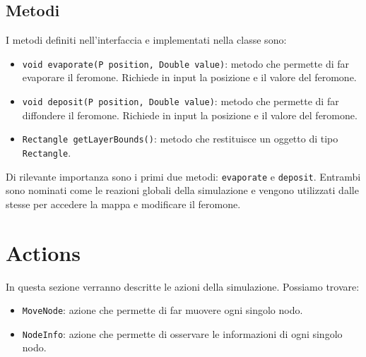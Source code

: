 \subsection{Metodi}
I metodi definiti nell'interfaccia e implementati nella classe sono:
\begin{itemize}
    \item \texttt{void evaporate(P position, Double value)}: metodo che permette di far evaporare il feromone. 
    Richiede in input la posizione e il valore del feromone.
    \item \texttt{void deposit(P position, Double value)}: metodo che permette di far diffondere il feromone.
     Richiede in input la posizione e il valore del feromone.
    \item \texttt{Rectangle getLayerBounds()}: metodo che restituisce un oggetto di tipo \texttt{Rectangle}.
\end{itemize}
Di rilevante importanza sono i primi due metodi: \texttt{evaporate} e \texttt{deposit}.
Entrambi sono nominati come le reazioni globali della simulazione e vengono utilizzati dalle stesse per accedere la mappa e modificare il feromone.


\section{Actions}
In questa sezione verranno descritte le azioni della simulazione. Possiamo trovare:
\begin{itemize}
    \item \texttt{MoveNode}: azione che permette di far muovere ogni singolo nodo.
    \item \texttt{NodeInfo}: azione che permette di osservare le informazioni di ogni singolo nodo.
\end{itemize}

